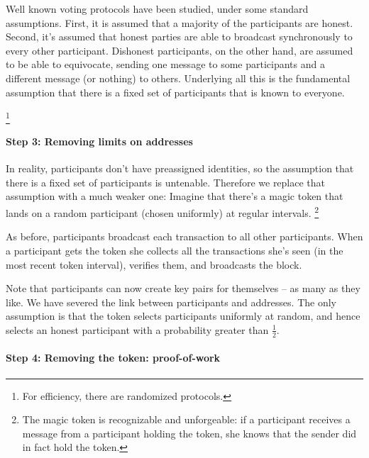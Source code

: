 Well known voting protocols have been studied, under some standard assumptions. First, it is assumed that a majority of the participants are honest. Second, it’s assumed that honest parties are able to broadcast synchronously to every other participant. Dishonest participants, on the other hand, are assumed to be able to equivocate, sending one message to some participants and a different message (or nothing) to others. Underlying all this is the fundamental assumption that there is a fixed set of participants that is known to everyone.

\footnote{For efficiency, there are randomized protocols.}

\paragraph{Step 3: Removing limits on addresses}

In reality, participants don’t have preassigned identities, so the assumption that there is a fixed set of participants is untenable. Therefore we replace that assumption with a much weaker one: Imagine that there’s a magic token that lands on a random participant (chosen uniformly) at regular intervals. \footnote{The magic token is recognizable and unforgeable: if a participant receives a message from a participant holding the token, she knows that the sender did in fact hold the token.}

As before, participants broadcast each transaction to all other participants. When a participant gets the token she collects all the transactions she’s seen (in the most recent token interval), verifies them, and broadcasts the block.


Note that participants can now create key pairs for themselves -- as many as they like. We have severed the link between participants and addresses. The only assumption is that the token selects participants uniformly at random, and hence selects an honest participant with a probability greater than $\frac{1}{2}$.

\paragraph{Step 4: Removing the token: proof-of-work}

